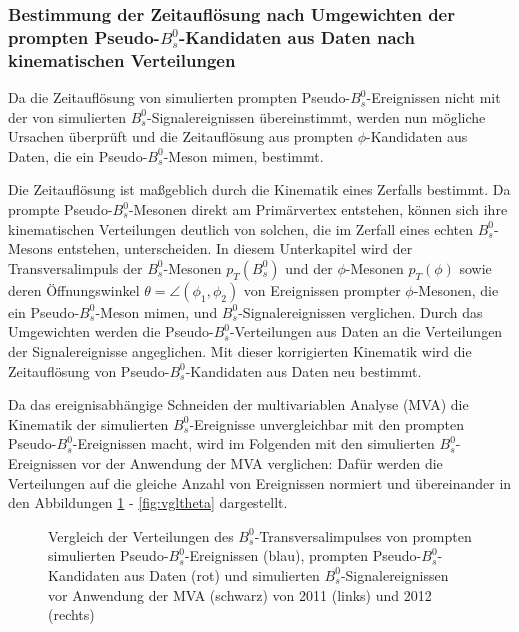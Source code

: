 \documentclass{article}
\begin{document}
\subsubsection{Bestimmung der Zeitauflösung nach Umgewichten der prompten Pseudo-$B_s^0$-Kandidaten aus Daten nach kinematischen Verteilungen}
Da die Zeitauflösung von simulierten prompten Pseudo-$B_s^0$-Ereignissen nicht mit der von simulierten $B_s^0$-Signalereignissen übereinstimmt, werden nun mögliche Ursachen überprüft und die Zeitauflösung aus prompten $\phi$-Kandidaten aus Daten, die ein Pseudo-$B_s^0$-Meson mimen, bestimmt. 

Die Zeitauflösung ist maßgeblich durch die Kinematik eines Zerfalls bestimmt. Da prompte Pseudo-$B_s^0$-Mesonen direkt am Primärvertex entstehen, können sich ihre kinematischen Verteilungen deutlich von solchen, die im Zerfall eines echten $B_s^0$-Mesons entstehen, unterscheiden. In diesem Unterkapitel wird der Transversalimpuls der $B_s^0$-Mesonen $p_T(B_s^0)$ und der $\phi$-Mesonen $p_{T}(\phi)$ sowie deren Öffnungswinkel $\theta=\angle(\phi_1,\phi_2)$ von Ereignissen prompter $\phi$-Mesonen, die ein Pseudo-$B_s^0$-Meson mimen, und $B_s^0$-Signalereignissen verglichen. Durch das Umgewichten werden die Pseudo-$B_s^0$-Verteilungen aus Daten an die Verteilungen der Signalereignisse angeglichen. Mit dieser korrigierten Kinematik wird die Zeitauflösung von Pseudo-$B_s^0$-Kandidaten aus Daten neu bestimmt.

Da das ereignisabhängige Schneiden der multivariablen Analyse (MVA) die Kinematik der simulierten $B_s^0$-Ereignisse unvergleichbar mit den prompten Pseudo-$B_s^0$-Ereignissen macht, wird im Folgenden mit den simulierten $B_s^0$-Ereignissen vor der Anwendung der MVA verglichen: Dafür werden die Verteilungen auf die gleiche Anzahl von Ereignissen normiert und übereinander in den Abbildungen \ref{fig:vglbspt} - \ref{fig:vgltheta} dargestellt. 


\begin{figure}[h!]
\caption{Vergleich der Verteilungen des $B_s^0$-Transversalimpulses von prompten simulierten Pseudo-$B_s^0$-Ereignissen (blau), prompten Pseudo-$B_s^0$-Kandidaten aus Daten (rot) und simulierten $B_s^0$-Signalereignissen vor Anwendung der MVA (schwarz) von 2011 (links) und 2012 (rechts)}
\label{fig:vglbspt}
\end{figure} 
\end{document}
